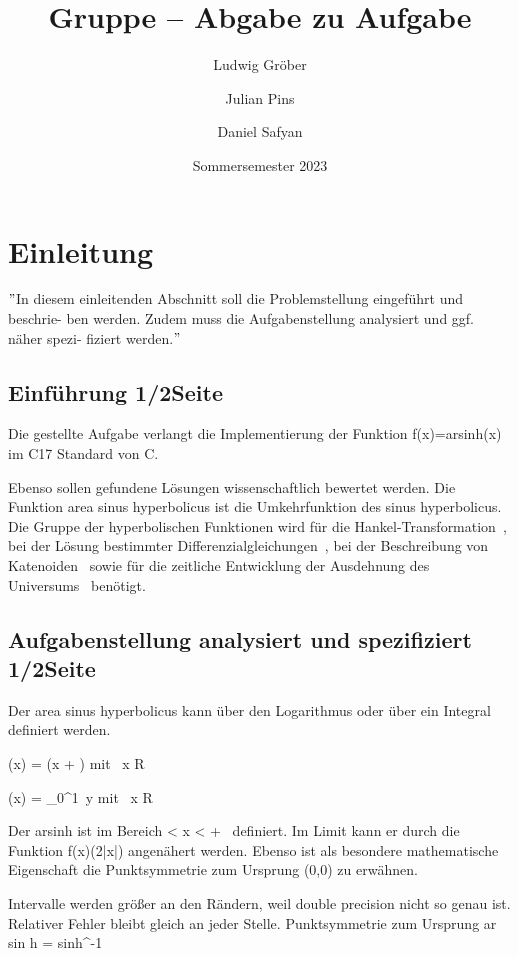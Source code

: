 \documentclass[course=erap]{aspdoc}
\author{Ludwig Gröber \and Julian Pins \and Daniel Safyan}
\date{Sommersemester 2023} %
\title{Gruppe \theGroup{} -- Abgabe zu Aufgabe \theNumber}
\begin{document}
\maketitle

\section{Einleitung}
\("\)In diesem einleitenden Abschnitt soll die Problemstellung eingeführt und beschrie- ben werden.
Zudem muss die Aufgabenstellung analysiert und ggf. näher spezi- fiziert werden.\("\)\n
\subsection{Einführung 1/2Seite}
Die gestellte Aufgabe verlangt die Implementierung der Funktion f(x)=arsinh(x) im C17 Standard von C.


Ebenso sollen gefundene Lösungen wissenschaftlich bewertet werden.
Die Funktion area sinus hyperbolicus ist die Umkehrfunktion des sinus hyperbolicus.
Die Gruppe der hyperbolischen Funktionen wird für die Hankel-Transformation~\cite{hankel},
bei der Lösung bestimmter Differenzialgleichungen~\cite{differenzial}, bei der Beschreibung von Katenoiden~\cite{katenoid}
sowie für die zeitliche Entwicklung der Ausdehnung des Universums~\cite{katenoid} benötigt.


\subsection{Aufgabenstellung analysiert und spezifiziert 1/2Seite}
Der area sinus hyperbolicus kann über den Logarithmus oder über ein Integral definiert werden.

(x) = \ln \left(x +  \right) mit \, x \in R


(x) = \int\_{0}^{1}  \,y mit \, x \in R



Der arsinh ist im Bereich \infty < x < + \infty \, definiert.
Im Limit kann er durch die Funktion f(x)\to \pm \ln(2|x|) angenähert werden.
Ebenso ist als besondere mathematische Eigenschaft die Punktsymmetrie zum Ursprung (0,0) zu erwähnen.

Intervalle werden größer an den Rändern, weil double precision nicht so genau ist.
Relativer Fehler bleibt gleich an jeder Stelle.
Punktsymmetrie zum Ursprung
ar sin h = sinh^-1
\end{document}
